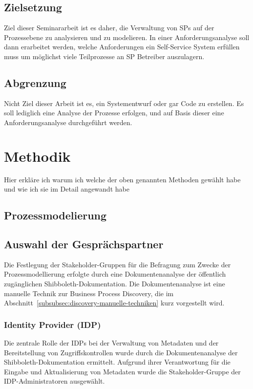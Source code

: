 \documentclass[a4paper, fontsize=11pt]{scrartcl}
\begin{document}
\subsection{Zielsetzung}\label{subsec:zielsetzung}
Ziel dieser Seminararbeit ist es daher, die Verwaltung von SPs auf der Prozessebene zu analysieren und zu modelieren.
In einer Anforderungsanalyse soll dann erarbeitet werden, welche Anforderungen ein Self-Service System erfüllen muss um möglichst viele Teilprozesse an SP Betreiber auszulagern.
\subsection{Abgrenzung}\label{subsec:abgrenzung}
Nicht Ziel dieser Arbeit ist es, ein Systementwurf oder gar Code zu erstellen.
Es soll lediglich eine Analyse der Prozesse erfolgen, und auf Basis dieser eine Anforderungsanalyse durchgeführt werden.




\section{Methodik}\label{sec:methodik}
Hier erkläre ich warum ich welche der oben genannten Methoden gewählt habe und wie ich sie im Detail angewandt habe
\subsection{Prozessmodelierung}\label{subsec:prozessmodelierung-methodik}
\subsection{Auswahl der Gesprächspartner}\label{subsubsec:auswahl-gespraechspartner}
Die Festlegung der Stakeholder-Gruppen für die Befragung zum Zwecke der Prozessmodellierung erfolgte durch eine Dokumentenanalyse der öffentlich zugänglichen Shibboleth-Dokumentation. 
Die Dokumentenanalyse ist eine manuelle Technik zur Business Process Discovery, die im Abschnitt~\ref{subsubsec:discovery-manuelle-techniken} kurz vorgestellt wird. 

\subsubsection{Identity Provider (IDP)}
Die zentrale Rolle der IDPs bei der Verwaltung von Metadaten und der Bereitstellung von Zugriffskontrollen wurde durch die Dokumentenanalyse der Shibboleth-Dokumentation ermittelt. 
Aufgrund ihrer Verantwortung für die Eingabe und Aktualisierung von Metadaten wurde die Stakeholder-Gruppe der IDP-Administratoren ausgewählt.
\end{document}
